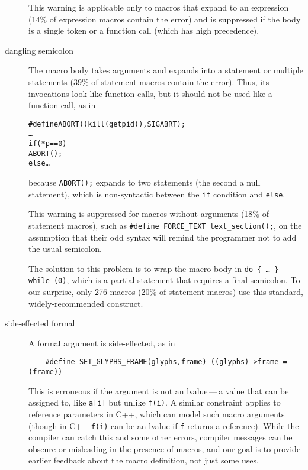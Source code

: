 \documentclass[10pt]{article}
\begin{document}
\begin{description}
        This warning is applicable only to macros that expand to an
        expression (14\% of expression macros contain the error) and is
        suppressed if the body is a single token or a function call (which
        has high precedence).

\item[dangling semicolon]\label{item:swallow-semicolon}
        The macro body takes arguments and expands into a statement or
        multiple statements (39\% of statement macros contain the error).
        Thus, its invocations look like function calls, but it should not
        be used like a function call, as in
\begin{alltt}
    #define ABORT() kill(getpid(),SIGABRT);
    \ldots
    if (*p == 0)
      ABORT();
    else \ldots
\end{alltt}
        because {\tt ABORT();} expands to two statements (the second a null
        statement), which is non-syntactic between the {\tt if} condition and
        {\tt else}.
        
        
        This warning is suppressed for macros without arguments (18\% of
        statement macros), such as {\tt \#define \verb|FORCE_TEXT|
        \verb|text_section|();}, on the assumption that their odd syntax
        will remind the programmer not to add the usual semicolon.

        
        The solution to this problem is to wrap the macro body in {\tt do
        \verb|{| \ldots\ \verb|}| while (0)}, which is a partial statement
      that requires a final semicolon.  To our surprise, only 276 macros
      (20\% of statement macros) use this standard, widely-recommended
      construct.

\item[side-effected formal]
        A formal argument is side-effected, as in
\begin{verbatim}
    #define SET_GLYPHS_FRAME(glyphs,frame) ((glyphs)->frame = (frame))
\end{verbatim}
        This is erroneous if the
        argument is not an lvalue\,---\,a value that can be assigned to, like
        {\tt a[i]} but unlike {\tt f(i)}.  A similar constraint applies to
        reference parameters in C++, which can model such macro arguments
        (though in C++ {\tt f(i)} can be an lvalue if {\tt f} returns a reference).
        While the compiler can catch this and some other errors, compiler
        messages can be obscure or misleading in the presence of macros,
        and our goal is to provide earlier feedback about the macro
        definition, not just some uses.


\end{description}
\end{document}
